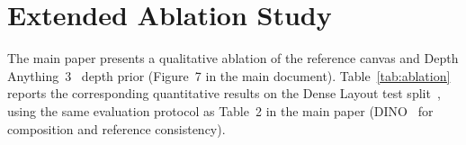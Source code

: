 \begin{table}[t]
  \centering
  \caption{Numerical and spatial reasoning on COCO-GR~\cite{feng2023layoutgpt}.
  GLIP-Accuracy measures image-level count/spatial compliance~\cite{li2022glip}.}
  \label{tab:layout_reasoning}
\end{table}

\section{Extended Ablation Study}
\label{supp:sec:ablation}

The main paper presents a qualitative ablation of the reference canvas and Depth Anything~3~\cite{depthanything3} depth prior (Figure~7 in the main document).
Table~\ref{tab:ablation} reports the corresponding quantitative results on the Dense Layout test split~\cite{xiang2025instanceassemble}, using the same evaluation protocol as Table~2 in the main paper (DINO~\cite{caron2021dino} for composition and reference consistency).

